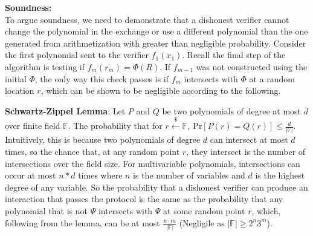 \documentclass[11pt]{article}
\begin{document}
\textbf{Soundness:}\\To argue soundness, we need to demonstrate that a dishonest verifier cannot change the polynomial in the exchange or use a different polynomial than the one generated from arithmetization with greater than negligible probability. Consider the first polynomial sent to the verifier $f_1(x_1)$. Recall the final step of the algorithm is testing if $f_{m}(r_m) = \Phi(R)$. If $f_{m-1}$ was not constructed using the initial $\Phi$, the only way this check passes is if $f_{m}$ intersects with $\Phi$ at a random location $r$, which can be shown to be negligible according to the following.
\vspace{1em}

\textbf{Schwartz-Zippel Lemma}: Let $P$ and $Q$ be two polynomials of degree at most $d$ over finite field $\mathbb{F}$. The probability that for $r \overset{\$}\leftarrow \mathbb{F},\  \text{Pr}[P(r) = Q(r)] \leq \frac{d}{\lvert \mathbb{F} \rvert}$. Intuitively, this is because two polynomials of degree $d$ can intersect at most $d$ times, so the chance that, at any random point $r$, they intersect is the number of intersections over the field size. For multivariable polynomials, intersections can occur at most $n * d$ times where $n$ is the number of variables and $d$ is the highest degree of any variable. So the probability that a dishonest verifier can produce an interaction that passes the protocol is the same as the probability that any polynomial that is not $\Psi$ intersects with $\Psi$ at some random point $r$, which, following from the lemma, can be at most $\frac{n\cdot m}{\lvert \mathbb{F} \rvert}$ (Negligile as $\lvert \mathbb{F} \rvert \geq 2^n3^m$).
\end{document}
